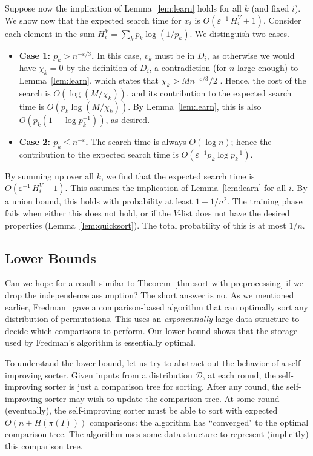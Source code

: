 \documentclass{siamltex}
\newcommand{\D}{\mathcal{D}}
\newcommand{\eps}{\varepsilon}
\begin{document}
Suppose now the implication of Lemma~\ref{lem:learn} holds for all $k$ 
(and fixed $i$).
We show now that the expected search time for $x_i$ is 
$O(\eps^{-1} \,H_i^V +1)$.
Consider each element in the sum $H_i^V = \sum_k p_k\log (1/p_k)$.
We distinguish two cases.

\begin{itemize}
\item \textbf{Case 1: $p_k > n^{-\eps/3}$.} 
In this case, $v_k$ must be in $D_i$,
as otherwise we would have $\chi_k = 0$
by the definition of $D_i$, a contradiction (for $n$ large enough)
to Lemma~\ref{lem:learn},
which states that $\chi_k > Mn^{-\eps/3}/2$ .
Hence,
the cost of the search is $O(\log (M/\chi_k))$, and its
contribution to the expected search time is 
$O(p_k \log (M/\chi_k))$. By Lemma~\ref{lem:learn},
this is also $O(p_k(1+\log p_k^{-1}))$, as desired.

\item
\textbf{Case 2: $p_k \leq n^{-\eps}$.} The search time is always 
$O(\log n)$; hence the contribution to 
the expected search time is $O(\eps^{-1} p_k\log p_k^{-1})$.
\end{itemize}

By summing up over all $k$, we find that 
the expected search time is $O(\eps^{-1} \,H_i^V +1)$.
This assumes the implication of Lemma~\ref{lem:learn} for all $i$.
By a union bound, this holds with probability at least $1-1/n^2$.
The training phase fails when either this does not hold,
or if the $V$-list does not have the desired properties 
(Lemma~\ref{lem:quicksort}).
The total probability of this is at most $1/n$.


\subsection{Lower Bounds} \label{sec:lb}

Can we hope for a result similar to Theorem~\ref{thm:sort-with-preprocessing}
if we drop the independence assumption? The short answer is no.
As we mentioned earlier, Fredman~\cite{Fredman76} gave a 
comparison-based algorithm that can optimally
sort any distribution of permutations. This uses 
an \emph{exponentially} large data
structure to decide which comparisons to perform. Our 
lower bound shows that the
storage used by Fredman's algorithm is essentially optimal.

To understand the lower bound, let us try to abstract out the behavior
of a self-improving sorter. Given inputs from a distribution $\D$, at each
round, the self-improving sorter is just a comparison tree for sorting.
After any round, the self-improving sorter may wish to update the 
comparison tree.
At some round (eventually), the self-improving sorter must
be able to sort with expected $O(n + H(\pi(I)))$ comparisons: 
the algorithm has ``converged" to the optimal comparison tree.
The algorithm uses some data structure to represent
(implicitly) this comparison tree.
\end{document}
